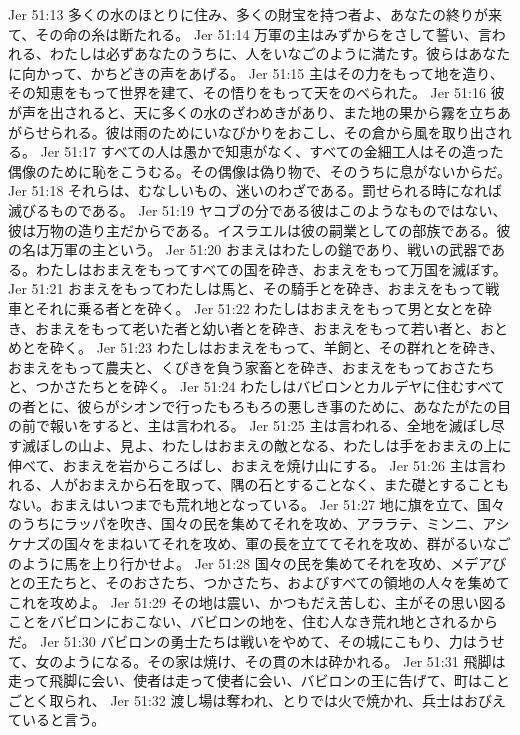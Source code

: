 Jer 51:13  多くの水のほとりに住み、多くの財宝を持つ者よ、あなたの終りが来て、その命の糸は断たれる。
Jer 51:14  万軍の主はみずからをさして誓い、言われる、わたしは必ずあなたのうちに、人をいなごのように満たす。彼らはあなたに向かって、かちどきの声をあげる。
Jer 51:15  主はその力をもって地を造り、その知恵をもって世界を建て、その悟りをもって天をのべられた。
Jer 51:16  彼が声を出されると、天に多くの水のざわめきがあり、また地の果から霧を立ちあがらせられる。彼は雨のためにいなびかりをおこし、その倉から風を取り出される。
Jer 51:17  すべての人は愚かで知恵がなく、すべての金細工人はその造った偶像のために恥をこうむる。その偶像は偽り物で、そのうちに息がないからだ。
Jer 51:18  それらは、むなしいもの、迷いのわざである。罰せられる時になれば滅びるものである。
Jer 51:19  ヤコブの分である彼はこのようなものではない、彼は万物の造り主だからである。イスラエルは彼の嗣業としての部族である。彼の名は万軍の主という。
Jer 51:20  おまえはわたしの鎚であり、戦いの武器である。わたしはおまえをもってすべての国を砕き、おまえをもって万国を滅ぼす。
Jer 51:21  おまえをもってわたしは馬と、その騎手とを砕き、おまえをもって戦車とそれに乗る者とを砕く。
Jer 51:22  わたしはおまえをもって男と女とを砕き、おまえをもって老いた者と幼い者とを砕き、おまえをもって若い者と、おとめとを砕く。
Jer 51:23  わたしはおまえをもって、羊飼と、その群れとを砕き、おまえをもって農夫と、くびきを負う家畜とを砕き、おまえをもっておさたちと、つかさたちとを砕く。
Jer 51:24  わたしはバビロンとカルデヤに住むすべての者とに、彼らがシオンで行ったもろもろの悪しき事のために、あなたがたの目の前で報いをすると、主は言われる。
Jer 51:25  主は言われる、全地を滅ぼし尽す滅ぼしの山よ、見よ、わたしはおまえの敵となる、わたしは手をおまえの上に伸べて、おまえを岩からころばし、おまえを焼け山にする。
Jer 51:26  主は言われる、人がおまえから石を取って、隅の石とすることなく、また礎とすることもない。おまえはいつまでも荒れ地となっている。
Jer 51:27  地に旗を立て、国々のうちにラッパを吹き、国々の民を集めてそれを攻め、アララテ、ミンニ、アシケナズの国々をまねいてそれを攻め、軍の長を立ててそれを攻め、群がるいなごのように馬を上り行かせよ。
Jer 51:28  国々の民を集めてそれを攻め、メデアびとの王たちと、そのおさたち、つかさたち、およびすべての領地の人々を集めてこれを攻めよ。
Jer 51:29  その地は震い、かつもだえ苦しむ、主がその思い図ることをバビロンにおこない、バビロンの地を、住む人なき荒れ地とされるからだ。
Jer 51:30  バビロンの勇士たちは戦いをやめて、その城にこもり、力はうせて、女のようになる。その家は焼け、その貫の木は砕かれる。
Jer 51:31  飛脚は走って飛脚に会い、使者は走って使者に会い、バビロンの王に告げて、町はことごとく取られ、
Jer 51:32  渡し場は奪われ、とりでは火で焼かれ、兵士はおびえていると言う。
